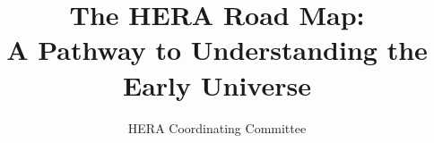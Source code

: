 \documentclass[manuscript]{aastex}
\begin{document}

\title{The HERA Road Map: \\ A Pathway to Understanding the Early Universe}


\author{HERA Coordinating Committee}













\end{document}
